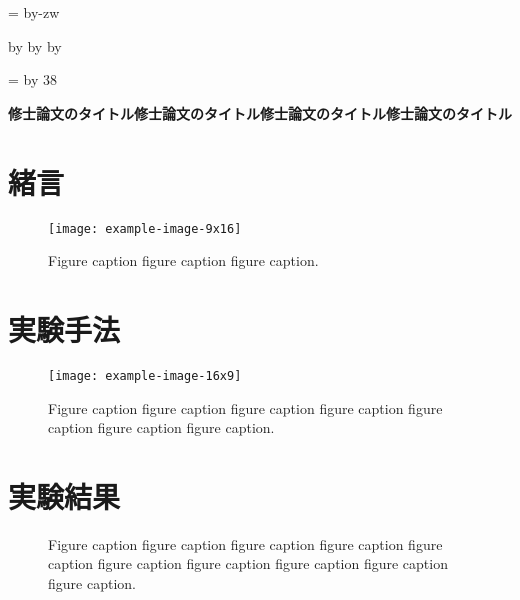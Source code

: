 \documentclass[11pt,dvipdfmx,svgnames,a4paper,uplatex]{ujarticle}
\makeatletter
\def\mojiparline#1{
  \newcounter{mpl}
  \setcounter{mpl}{#1}
  \@tempdima=\linewidth
  \advance\@tempdima by-\value{mpl}zw
  \addtocounter{mpl}{-1}
  \divide\@tempdima by \value{mpl}
  \advance\kanjiskip by\@tempdima
  \advance\parindent by\@tempdima
}
\def\linesparpage#1{
  \baselineskip=\textheight
  \divide\baselineskip by #1
}
\makeatother
\begin{document}
\mojiparline{42}  %
\linesparpage{38}  %

\centerline{\textbf{
  修士論文のタイトル修士論文のタイトル修士論文のタイトル修士論文のタイトル
}}

\section{緒言}

\begin{wrapfigure}{r}{12zw}
  \vspace*{-\intextsep}
  \centering
  \texttt{[image: example-image-9x16]}
  \caption{
    Figure caption figure caption figure caption.
  }
  \label{fig:intruduction}
  \vspace*{-\intextsep}
\end{wrapfigure}

\textcolor{LightGray}{
}


\section{実験手法}  %

\begin{wrapfigure}{r}{26zw}
  \vspace*{-\intextsep}
  \centering
  \texttt{[image: example-image-16x9]}
  \caption{
    Figure caption figure caption figure caption figure caption figure caption figure caption figure caption.
  }
  \label{fig:intruduction}
  \vspace*{-\intextsep}
\end{wrapfigure}

\textcolor{LightGray}{
}


\section{実験結果}  %

\begin{figure}[htb]
  \centering
  \caption{
    Figure caption figure caption figure caption figure caption figure caption figure caption figure caption figure caption figure caption figure caption.
  }
  \label{fig:fig_result}
\end{figure}
\end{document}
